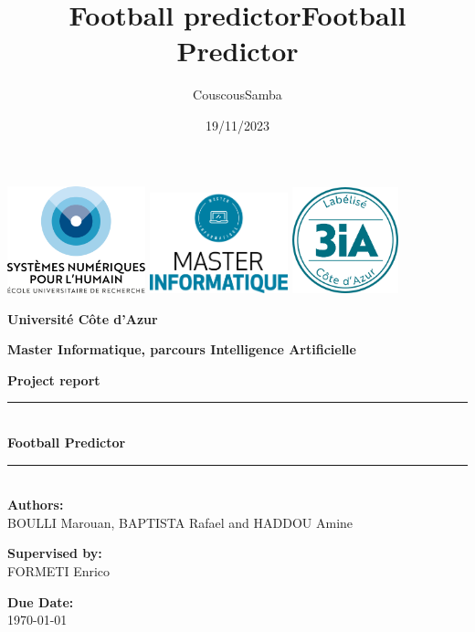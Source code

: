\documentclass[a4paper,12pt]{article}
\title{Football predictor}
\title{\huge\bf Football Predictor}
\date{19/11/2023}
\author{CouscousSamba}
\begin{document}
\begin{titlepage}
    \begin{center}
        \includegraphics[width=0.3\textwidth]{images/DS4HlogocouleurFR.png} \hfill
        \includegraphics[width=0.3\textwidth]{images/logo_master.png} \hfill
        \includegraphics[width=0.23\textwidth]{images/tampon-3IA.png}
        
        \vspace{1.5cm}
        
        \textbf{\LARGE Université C\^ote d'Azur}
        
        \vspace{0.5cm}
        
        \textbf{\Large Master Informatique, parcours Intelligence Artificielle}
        
        \vspace{1.5cm}
        
        \textbf{\Large Project report}
        
        \vspace{0.5cm}
        
        \rule{\linewidth}{0.5mm} \\[0.4cm]
        {\LARGE \bfseries Football Predictor \\[0.2cm]}
        \rule{\linewidth}{0.5mm} \\[1.5cm]
        
        \textbf{Authors:} \\
        BOULLI Marouan, BAPTISTA Rafael and HADDOU Amine   \\
        
        \vspace{0.8cm}
        
        \textbf{Supervised by:} \\
        FORMETI Enrico\\
        
        \vspace{1.5cm}
        
        \textbf{Due Date:} \\
        \today
        
    \end{center}
\end{titlepage}
\end{document}
